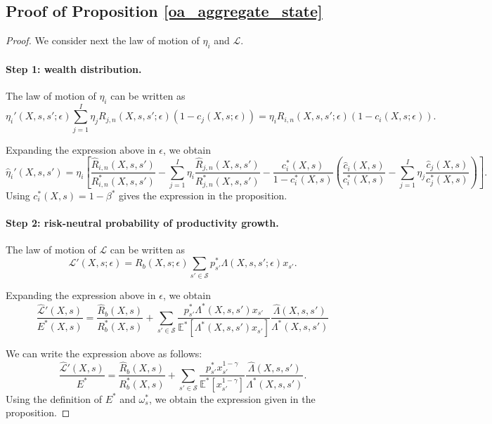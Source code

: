 \subsection{Proof of Proposition \ref{oa_aggregate_state}}\label{proof: oa_aggregate_state}
\begin{proof}
We consider next the law of motion of $\eta_i$ and $\mathcal{L}$.
\paragraph{Step 1: wealth distribution.} The law of motion of $\eta_i$ can be written as
\begin{equation}
    \eta_i'(X,s,s';\epsilon) \sum_{j=1}^I\eta_j R_{j,n}(X,s,s';\epsilon) (1-c_j(X,s;\epsilon))  = \eta_i R_{i,n}(X,s,s';\epsilon) (1-c_i(X,s;\epsilon)). 
\end{equation}

Expanding the expression above in $\epsilon$, we obtain
\begin{equation}
    \hat{\eta}_i'(X,s,s') = \eta_i \left[ \frac{\hat{R}_{i,n}(X,s,s')}{R^*_{i,n}(X,s,s')}-\sum_{j=1}^I \eta_i \frac{\hat{R}_{j,n}(X,s,s')}{R^*_{j,n}(X,s,s')} - \frac{c_i^*(X,s)}{1-c_i^*(X,s)}\left(\frac{\hat{c}_i(X,s)}{c^*_i(X,s)}  - \sum_{j=1}^I \eta_j \frac{\hat{c}_j(X,s)}{c_j^*(X,s)} \right)\right].
\end{equation}
Using $c_i^*(X,s) = 1-\beta^*$ gives the expression in the proposition.

\paragraph{Step 2: risk-neutral probability of productivity growth.} The law of motion of $\mathcal{L}$ can be written as
\begin{equation}
    \mathcal{L}'(X,s;\epsilon)  = R_b(X,s;\epsilon) \sum_{s'\in\mathcal{S}}p_{s'}^* \Lambda(X,s,s';\epsilon) x_{s'}.
\end{equation}

Expanding the expression above in $\epsilon$, we obtain
\begin{equation}
    \frac{\hat{\mathcal{L}}'(X,s)}{E^*(X,s)} = \frac{ \hat{R}_b(X,s) }{R_b^*(X,s)} +  \sum_{s'\in\mathcal{S}}\frac{p_{s'}^* \Lambda^*(X,s,s')x_{s'}}{\mathbb{E}^*[\Lambda^*(X,s,s') x_{s'}]} \frac{\hat{\Lambda}(X,s,s')}{\Lambda^*(X,s,s')} 
\end{equation}

We can write the expression above as follows:
\begin{equation}
    \frac{\hat{\mathcal{L}}'(X,s)}{E^*} = \frac{\hat{R}_b(X,s)}{R_b^*(X,s)} +  
    \sum_{s'\in \mathcal{S}} \frac{p_{s'}^* x_{s'}^{1-\gamma}}{\mathbb{E}^*[x_{s'}^{1-\gamma}]}\frac{\hat{\Lambda}(X,s,s')}{\Lambda^*(X,s,s')}.
\end{equation}
Using the definition of $E^*$ and $\omega_{s}^*$, we obtain the expression given in the proposition.
\end{proof}

